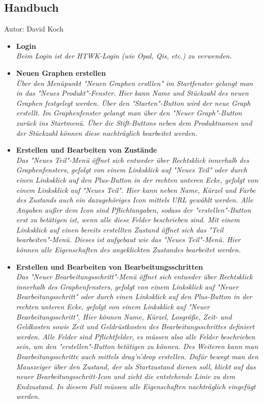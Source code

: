 \documentclass[twoside]{report}
\begin{document}
\subsection{Handbuch}
{\small Autor: David Koch}
\begin{itemize}
  \item \textbf{ Login }
    \\\textit{
      Beim Login ist der HTWK-Login (wie Opal, Qis, etc.) zu verwenden. }
  \item \textbf{ Neuen Graphen erstellen }
    \\\textit{
      Über den Menüpunkt "Neuen Graphen erstllen" im Startfenster gelangt man in das "Neues Produkt"-Fenster. Hier kann Name und Stückzahl des neuen Graphen festgelegt werden. Über den "Starten"-Button wird der neue Graph erstellt. Im Graphenfenster gelangt man über den "Neuer Graph"-Button zurück ins Startmenü. Über die Stift-Buttons neben dem Produktnamen und der Stückzahl können diese nachträglich bearbeitet werden. }
  \item \textbf{ Erstellen und Bearbeiten von Zustände }
    \\\textit{
      Das "Neues Teil"-Menü öffnet sich entweder über Rechtsklick innerhalb des Graphenfensters, gefolgt von einem Linksklick auf "Neues Teil" oder durch einen Linksklick auf den Plus-Button in der rechten unteren Ecke, gefolgt von einem Linksklick auf "Neues Teil". Hier kann neben Name, Kürzel und Farbe des Zustands auch ein dazugehöriges Icon mittels URL gewählt werden. Alle Angaben außer dem Icon sind Pflichtangaben, sodass der "erstellen"-Button erst zu betätigen ist, wenn alle diese Felder beschrieben sind.
Mit einem Linksklick auf einen bereits erstellten Zustand öffnet sich das "Teil bearbeiten"-Menü. Dieses ist aufgebaut wie das "Neues Teil"-Menü. Hier können alle Eigenschaften des angeklickten Zustandes bearbeitet werden. }
  \item \textbf{ Erstellen und Bearbeiten von Bearbeitungsschritten }
    \\\textit{
      Das "Neuer Bearbeitungsschritt"-Menü öffnet sich entweder über Rechtsklick innerhalb des Graphenfensters, gefolgt von einem Linksklick auf "Neuer Bearbeitungsschritt" oder durch einen Linksklick auf den Plus-Button in der rechten unteren Ecke, gefolgt von einem Linksklick auf "Neuer Bearbeitungsschritt". Hier können Name, Kürzel, Losgröße, Zeit- und Geldkosten sowie Zeit und Geldrüstkosten des Bearbeitungsschrittes definiert werden. Alle Felder sind Pflichtfelder, es müssen also alle Felder beschrieben sein, um den "erstellen"-Button betätigen zu können. Des Weiteren kann man Bearbeitungsschritte auch mittels drag'n'drop erstellen. Dafür bewegt man den Mauszeiger über den Zustand, der als Startzustand dienen soll, klickt auf das neuer Bearbeitungsschritt-Icon und zieht die entstehende Linie zu dem Endzustand. In diesem Fall müssen alle Eigenschaften nachträglich eingefügt werden.
}
\end{itemize}
\end{document}
